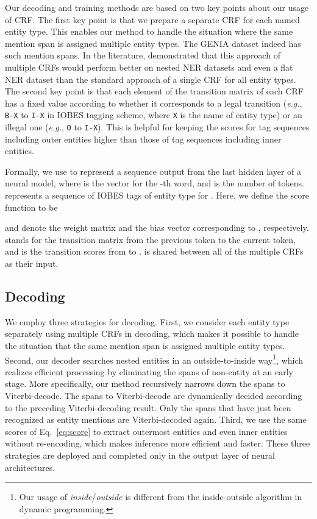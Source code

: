 \documentclass[11pt,a4paper]{article}
\def\equref#1{Eq.~\ref{#1}}
\begin{document}
Our decoding and training methods are based on two key points about our usage of CRF.
The first key point is that we prepare a separate CRF for each named entity type.
This enables our method to handle the situation where the same mention span is assigned multiple entity types.
The GENIA dataset indeed has such mention spans.
In the literature, \citet{muis-lu-2017-labeling} demonstrated that this approach of multiple CRFs would perform better on nested NER datasets and even a flat NER dataset than the standard approach of a single CRF for all entity types.
The second key point is that each element of the transition matrix of each CRF has a fixed value according to whether it corresponds to a legal transition ({\em e.g.}, {\tt B-X} to {\tt I-X} in IOBES tagging scheme, where {\tt X} is the name of entity type) or an illegal one ({\em e.g.}, {\tt O} to {\tt I-X}).
This is helpful for keeping the scores for tag sequences including outer entities higher than those of tag sequences including inner entities.

Formally, we use  to represent a sequence output from the last hidden layer of a neural model, where  is the vector for the -th word, and  is the number of tokens.
 represents a sequence of IOBES tags of entity type  for . Here, we define the score function to be


 and  denote the weight matrix and the bias vector corresponding to , respectively.
 stands for the transition matrix from the previous token to the current token, and  is the transition scores from  to .
 is shared between all of the multiple CRFs as their input.

\subsection{Decoding}

We employ three strategies for decoding.
First, we consider each entity type separately using multiple CRFs in decoding, which makes it possible to handle the situation that the same mention span is assigned multiple entity types.
Second, our decoder searches nested entities in an outside-to-inside way\footnote{Our usage of {\it inside}/{\it outside} is different from the inside-outside algorithm in dynamic programming.}, which realizes efficient processing by eliminating the spans of non-entity at an early stage.
More specifically, our method recursively narrows down the spans to Viterbi-decode.
The spans to Viterbi-decode are dynamically decided according to the preceding Viterbi-decoding result.
Only the spans that have just been recognized as entity mentions are Viterbi-decoded again.
Third, we use the same scores  of \equref{eq:score} to extract outermost entities and even inner entities without re-encoding, which makes inference more efficient and faster.
These three strategies are deployed and completed only in the output layer of neural architectures.
\end{document}
